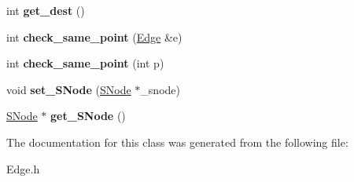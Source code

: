 \begin{DoxyCompactItemize}
\mbox{\label{class_edge_a28c76bb17f7ff1ee5b532093387d8af6}} 
int {\bfseries get\+\_\+dest} ()
\item 
\mbox{\label{class_edge_a18c82b71f74cae7f21cc3f0ea40ff0f4}} 
int {\bfseries check\+\_\+same\+\_\+point} (\mbox{\hyperlink{class_edge}{Edge}} \&e)
\item 
\mbox{\label{class_edge_a1073e78fa94ec3f56cce1509a72889b5}} 
int {\bfseries check\+\_\+same\+\_\+point} (int p)
\item 
\mbox{\label{class_edge_ae99ad288d0c4c7995d794dbb5d85b817}} 
void {\bfseries set\+\_\+\+S\+Node} (\mbox{\hyperlink{class_s_node}{S\+Node}} $\ast$\+\_\+snode)
\item 
\mbox{\label{class_edge_a204aac509a31bb3243dc3d43603b25a4}} 
\mbox{\hyperlink{class_s_node}{S\+Node}} $\ast$ {\bfseries get\+\_\+\+S\+Node} ()
\end{DoxyCompactItemize}


The documentation for this class was generated from the following file\+:\begin{DoxyCompactItemize}
\item 
Edge.\+h\end{DoxyCompactItemize}
